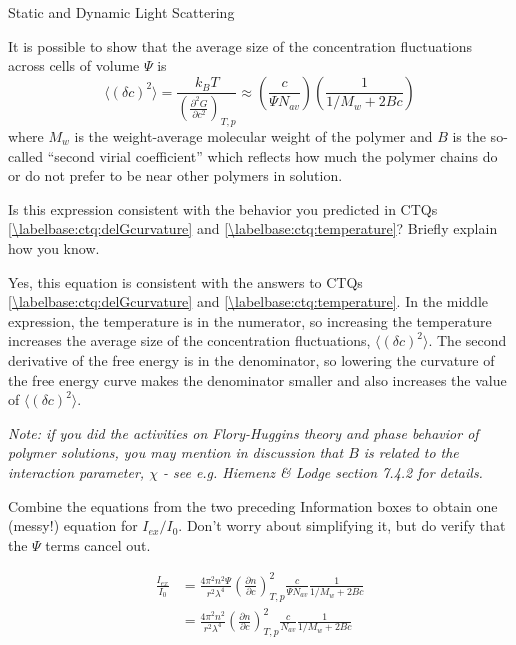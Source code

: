 \begin{activity}{Static and Dynamic Light Scattering}
\begin{infobox}
	It is possible to show that the average size of the concentration fluctuations across cells of volume $\Psi$ is
	\begin{equation*}
		\langle (\delta c)^2\rangle = \frac{k_BT}{\left( \frac{\partial^2 G}{\partial c^2}\right)_{T,p}} \approx \left(\frac{c}{\Psi N_{av}}\right) \left(\frac{1}{1/M_w + 2Bc}\right)
	\end{equation*}
	where $M_w$ is the weight-average molecular weight of the polymer and $B$ is the so-called ``second virial coefficient'' which reflects how much the polymer chains do or do not prefer to be near other polymers in solution.
\end{infobox}

\begin{ctqs}
	\question Is this expression consistent with the behavior you predicted in CTQs \ref{\labelbase:ctq:delGcurvature} and \ref{\labelbase:ctq:temperature}?  Briefly explain how you know.
	
		\begin{solution}[1.5in]{}
		
			Yes, this equation is consistent with the answers to CTQs \ref{\labelbase:ctq:delGcurvature} and \ref{\labelbase:ctq:temperature}.  In the middle expression, the temperature is in the numerator, so increasing the temperature increases the average size of the concentration fluctuations, $\langle (\delta c)^2\rangle$.  The second derivative of the free energy is in the denominator, so lowering the curvature of the free energy curve makes the denominator smaller and also increases the value of $\langle (\delta c)^2\rangle$.
			
			\emph{Note: if you did the activities on Flory-Huggins theory and phase behavior of polymer solutions, you may mention in discussion that $B$ is related to the interaction parameter, $\chi$ - see e.g. Hiemenz \& Lodge section 7.4.2 for details.}
		\end{solution}

	\question Combine the equations from the two preceding Information boxes to obtain one (messy!) equation for $I_{ex}/I_0$.   Don't worry about simplifying it, but do verify that the $\Psi$ terms cancel out.
	
		\begin{solution}[1.5in]{}
			\begin{align*}
				\frac{I_{ex}}{I_0} &= \frac{4 \pi^2 n^2 \Psi}{r^2 \lambda^4}\left(\frac{\partial n}{\partial c}\right)^2_{T,p} \frac{c}{\Psi N_{av}} \frac{1}{1/M_w + 2Bc} \\
				&= \frac{4 \pi^2 n^2}{r^2 \lambda^4}\left(\frac{\partial n}{\partial c}\right)^2_{T,p} \frac{c}{ N_{av}} \frac{1}{1/M_w + 2Bc}
			\end{align*}
		\end{solution}
		

\end{ctqs}
\end{activity}
